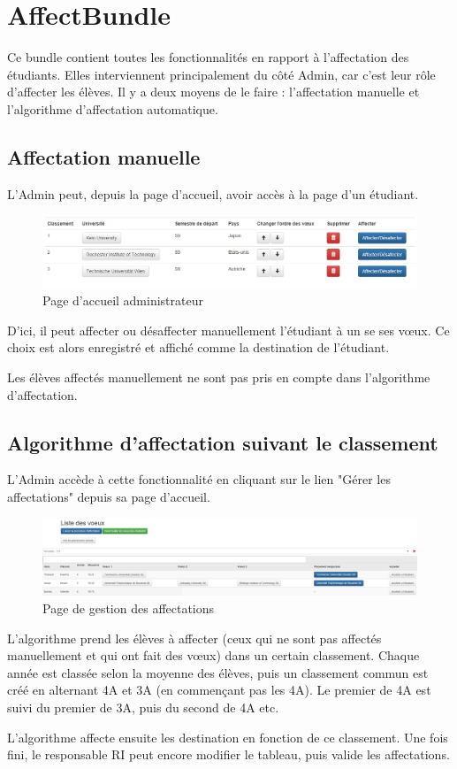 \chapter{AffectBundle}

Ce bundle contient toutes les fonctionnalités en rapport à l'affectation des étudiants.
Elles interviennent principalement du côté Admin, car c'est leur rôle d'affecter les élèves. Il y a deux moyens de le faire : l'affectation manuelle et l'algorithme d'affectation automatique.

\section{Affectation manuelle}

L'Admin peut, depuis la page d'accueil, avoir accès à la page d'un étudiant. 
 \bigbreak
 \begin{figure}[H]
	\centering
 \includegraphics[scale=0.5]{images/voeux_etud_vupar_admin.PNG}
	\caption{Page d'accueil administrateur}
	\label{gm}
\end{figure}
 
\bigbreak
D'ici, il peut affecter ou désaffecter manuellement l'étudiant à un se ses vœux.
Ce choix est alors enregistré et affiché comme la destination de l'étudiant.

Les élèves affectés manuellement ne sont pas pris en compte dans l'algorithme d'affectation.

\section{Algorithme d'affectation suivant le classement}

L'Admin accède à cette fonctionnalité en cliquant sur le lien "Gérer les affectations" depuis sa page d'accueil.
\bigbreak
\begin{figure}[H]
	\centering
	\includegraphics[scale=0.22]{images/Liste_de_voeux_admin.PNG}
	\caption{Page de gestion des affectations}
	\label{ga}
\end{figure}
\bigbreak
L'algorithme prend les élèves à affecter (ceux qui ne sont pas affectés manuellement et qui ont fait des vœux) dans un certain classement. Chaque année est classée selon la moyenne des élèves, puis un classement commun est créé en alternant 4A et 3A (en commençant pas les 4A). Le premier de 4A est suivi du premier de 3A, puis du second de 4A etc.

L'algorithme affecte ensuite les destination en fonction de ce classement.
Une fois fini, le responsable RI peut encore modifier le tableau, puis valide les affectations.


